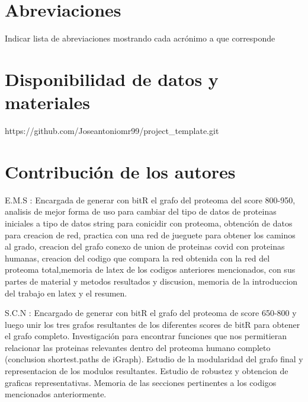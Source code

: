 \documentclass{bmcart}
\begin{document}
	\begin{backmatter}
	
		\section*{Abreviaciones}%
			Indicar lista de abreviaciones mostrando cada acrónimo a que corresponde
		
		\section*{Disponibilidad de datos y materiales}%
			https://github.com/Joseantoniomr99/project_template.git
		
		\section*{Contribución de los autores}
			E.M.S : Encargada de generar con bitR el grafo del proteoma del score 800-950, analisis de mejor forma de uso para cambiar del tipo de 
			datos de proteinas iniciales a tipo de datos string para conicidir con proteoma, obtención de datos para creacion de red, 
			practica con una red de jueguete para obtener los caminos al grado, creacion del grafo conexo de union de proteinas covid con proteinas 
			humanas, creacion del codigo que compara la red obtenida con la red del proteoma total,memoria de latex de los codigos
			anteriores mencionados, con sus partes de material y metodos resultados y discusion, memoria de la introduccion del trabajo en latex 
			y el resumen.
			
			S.C.N : Encargado de generar con bitR el grafo del proteoma de score 650-800 y luego unir los tres grafos resultantes de los diferentes 
			scores de bitR para obtener el grafo completo. Investigación para encontrar funciones que nos permitieran relacionar las proteinas 
			relevantes dentro del proteoma humano completo (conclusion shortest.paths de iGraph). 
			Estudio de la modularidad del grafo final y representacion de los modulos resultantes. Estudio de robustez y obtencion de graficas representativas.
			Memoria de las secciones pertinentes a los codigos mencionados anteriormente.
		
		
		
	
	\end{backmatter}
\end{document}
